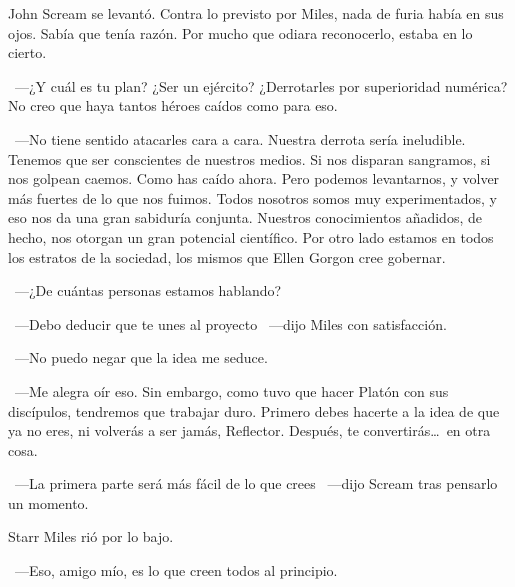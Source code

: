 John Scream se levantó. Contra lo previsto por Miles, nada de furia había en sus ojos. Sabía que tenía razón. Por mucho que odiara reconocerlo, estaba en lo cierto.

~---¿Y cuál es tu plan? ¿Ser un ejército? ¿Derrotarles por superioridad numérica? No creo que haya tantos héroes caídos como para eso.

~---No tiene sentido atacarles cara a cara. Nuestra derrota sería ineludible. Tenemos que ser conscientes de nuestros medios. Si nos disparan sangramos, si nos golpean caemos. Como has caído ahora. Pero podemos levantarnos, y volver más fuertes de lo que nos fuimos. Todos nosotros somos muy experimentados, y eso nos da una gran sabiduría conjunta. Nuestros conocimientos añadidos, de hecho, nos otorgan un gran potencial científico. Por otro lado estamos en todos los estratos de la sociedad, los mismos que Ellen Gorgon cree gobernar.

~---¿De cuántas personas estamos hablando?

~---Debo deducir que te unes al proyecto ~---dijo Miles con satisfacción.

~---No puedo negar que la idea me seduce.

~---Me alegra oír eso. Sin embargo, como tuvo que hacer Platón con sus discípulos, tendremos que trabajar duro. Primero debes hacerte a la idea de que ya no eres, ni volverás a ser jamás, Reflector. Después, te convertirás\dots\ en otra cosa.

~---La primera parte será más fácil de lo que crees ~---dijo Scream tras pensarlo un momento.

Starr Miles rió por lo bajo.

~---Eso, amigo mío, es lo que creen todos al principio.

\endinput
